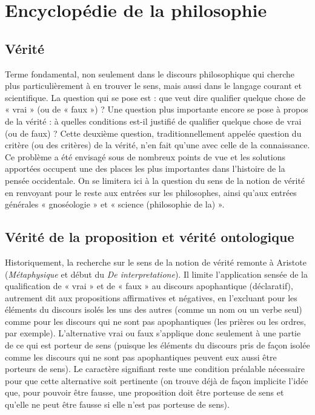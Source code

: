 
\section{Encyclopédie de la philosophie}

\subsection{Vérité}

Terme fondamental, non seulement
dans le discours philosophique qui
cherche plus particulièrement à en trouver
le sens, mais aussi dans le langage
courant et scientifique. La question qui se
pose est : que veut dire qualifier quelque
chose de « vrai » (ou de « faux ») ? Une
question plus importante encore se pose
à propos de la vérité : à quelles conditions
est-il justifié de qualifier quelque chose de
vrai (ou de faux) ? Cette deuxième question,
traditionnellement appelée question
du critère (ou des critères) de la vérité,
n’en fait qu’une avec celle de la connaissance.
Ce problème a été envisagé sous de
nombreux points de vue et les solutions
apportées occupent une des places les
plus importantes dans l’histoire de la pensée
occidentale. On se limitera ici à la
question du sens de la notion de vérité en
renvoyant pour le reste aux entrées sur les
philosophes, ainsi qu’aux entrées générales
« gnoséologie » et « science (philosophie de la) ».

\subsection{Vérité de la proposition
et vérité ontologique}

Historiquement, la recherche sur le
sens de la notion de vérité remonte à
Aristote ({\it Métaphysique} et début du {\it De
interpretatione}). Il limite l’application sensée
de la qualification de « vrai » et de
« faux » au discours apophantique (déclaratif),
autrement dit aux propositions
affirmatives et négatives, en l’excluant
pour les éléments du discours isolés les
uns des autres (comme un nom ou un
verbe seul) comme pour les discours qui
ne sont pas apophantiques (les prières ou
les ordres, par exemple). L’alternative
vrai ou faux s’applique donc seulement à
une partie de ce qui est porteur de sens
(puisque les éléments du discours pris de
façon isolée comme les discours qui ne
sont pas apophantiques peuvent eux aussi
être porteurs de sens). Le caractère signifiant
reste une condition préalable nécessaire
pour que cette alternative soit
pertinente (on trouve déjà de façon implicite
l’idée que, pour pouvoir être fausse,
une proposition doit être porteuse de sens
et qu’elle ne peut être fausse si elle n’est
pas porteuse de sens).


